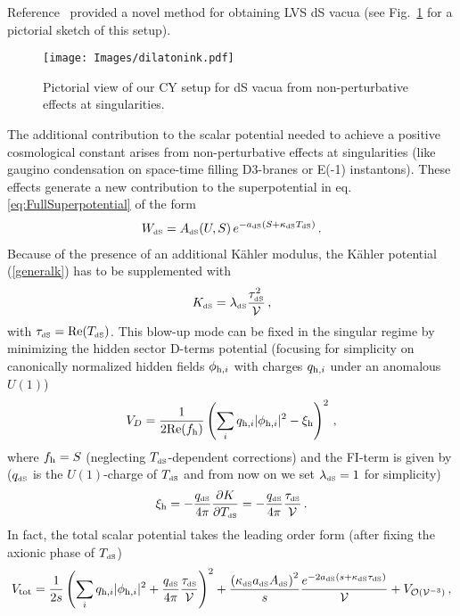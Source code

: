 \documentclass[12pt,a4paper]{book}
\def\dS{{\scriptscriptstyle \rm dS}}
\newcommand{\mc}{\mathcal}
\begin{document}
Reference~\cite{Cicoli:2012fh} provided a novel method for obtaining LVS dS vacua (see Fig.~\ref{Fig2} for a pictorial sketch of this setup).
\begin{figure}[t]
\begin{center}
\texttt{[image: Images/dilatonink.pdf]}
\caption{Pictorial view of our CY setup for dS vacua from non-perturbative effects at singularities.} \label{Fig2}
\end{center}
\end{figure}
The additional contribution to the scalar potential needed to achieve a positive cosmological constant arises
from non-perturbative effects at singularities (like gaugino condensation on space-time filling D3-branes or E(-1) instantons). These effects generate a new contribution to the superpotential in eq. \eqref{eq:FullSuperpotential} of the form
\begin{align}
W_\dS = A_\dS(U, S) \,e^{-a_\dS (S + \kappa_\dS T_\dS)}\,.
\label{Wds2}
\end{align}
Because of the presence of an additional K\"ahler modulus, the K\"ahler potential (\ref{generalk}) has to be supplemented with
\begin{align}
\label{dk2}
K_\dS =  \lambda_\dS\frac{\tau_\dS^2}{\mathcal{V}}\,,
\end{align}
with $\tau_\dS={\rm Re}(T_\dS)$. This blow-up mode can be fixed in the singular regime by minimizing the hidden sector D-terms potential (focusing for simplicity on canonically normalized hidden fields $\phi_{{\rm h},i}$ with charges $q_{{\rm h},i}$ under an anomalous $U(1)$)
\begin{align}
\label{DtermPot1}
V_D = \frac{1}{2{\rm Re}(f_{\rm h})} \left(\sum_i q_{{\rm h},i} |\phi_{{\rm h},i}|^2 - \xi_{\rm h}\right)^2\,,
\end{align}
where $f_{\rm h} = S$ (neglecting $T_\dS$-dependent corrections) and the FI-term is given by
($q_\dS$ is the $U(1)$-charge of $T_\dS$ and from now on we set $\lambda_\dS=1$ for simplicity)
\begin{align}
\xi_{\rm h} = - \frac{q_\dS}{4\pi} \frac{\partial K}{\partial T_\dS} = - \frac{q_\dS}{4\pi} \frac{\tau_\dS}{\mathcal{V}}\,.
\end{align}
In fact, the total scalar potential takes the leading order form (after fixing the axionic phase of $T_\dS$)~\cite{Cicoli:2012fh}
\begin{align}
V_{\rm tot} = \frac{1}{2s} \left(\sum_i q_{{\rm h},i} |\phi_{{\rm h},i}|^2 + \frac{q_\dS}{4\pi} \frac{\tau_\dS}{\mathcal{V}}\right)^2
+ \frac{\left(\kappa_\dS a_\dS A_\dS\right)^2}{s}\frac{e^{-2 a_\dS \left(s+\kappa_\dS\tau_\dS\right)}}{\mathcal{V}} + V_{\mc{O}(\mathcal{V}^{-3})}\,,
\label{Vtot1}
\end{align}
\end{document}
